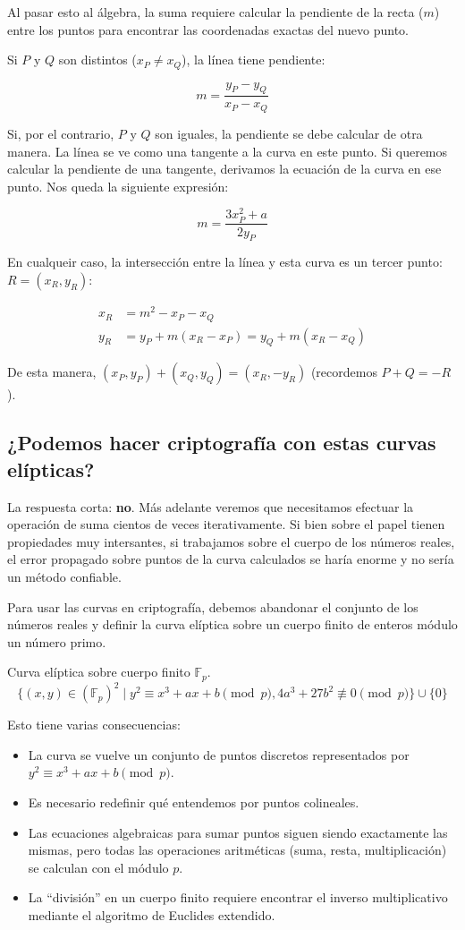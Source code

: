 Al pasar esto al álgebra, la suma requiere calcular la pendiente de la recta ($m$) entre los puntos para encontrar las coordenadas exactas del nuevo punto.

Si $P$ y $Q$ son distintos ($x_P \neq x_Q$), la línea tiene pendiente:

$$m = \frac{y_P - y_Q}{x_P - x_Q}$$


Si, por el contrario, $P$ y $Q$ son iguales, la pendiente se debe calcular de otra manera. La línea se ve como una tangente a la curva en este punto. Si queremos calcular la pendiente de una tangente, derivamos la ecuación de la curva en ese punto. Nos queda la siguiente expresión:

$$m = \frac{3x_P^2 + a}{2y_P}$$

En cualqueir caso, la intersección entre la línea y esta curva es un tercer punto: $R = (x_R, y_R)$:

$$
\begin{aligned}
x_R &= m^2 - x_P - x_Q \\
y_R &= y_P + m(x_R - x_P) = y_Q + m(x_R - x_Q)
\end{aligned}
$$

De esta manera, $(x_P, y_P) + (x_Q, y_Q) = (x_R, -y_R)$ (recordemos $P + Q = -R$).

\subsection{¿Podemos hacer criptografía con estas curvas elípticas?}

La respuesta corta: \textbf{no}. Más adelante veremos que necesitamos efectuar la operación de suma cientos de veces iterativamente. Si bien sobre el papel tienen propiedades muy intersantes, si trabajamos sobre el cuerpo de los números reales, el error propagado sobre puntos de la curva calculados se haría enorme y no sería un método confiable. 

Para usar las curvas en criptografía, debemos abandonar el conjunto de los números reales y definir la curva elíptica sobre un cuerpo finito de enteros módulo un número primo.

\begin{definition} Curva elíptica sobre cuerpo finito $\mathbb{F}_p$.
$$\{ (x, y) \in (\mathbb{F}_p)^2 \mid y^2 \equiv x^3 + ax + b \pmod p, 4a^3 + 27b^2 \not\equiv 0 \pmod p \} \cup \{0\}$$
\end{definition}

Esto tiene varias consecuencias:
\begin{itemize}
    \item La curva se vuelve un conjunto de puntos discretos representados por $y^2 \equiv x^3 + ax + b \pmod{p}$.
    \item Es necesario redefinir qué entendemos por puntos colineales.
    \item Las ecuaciones algebraicas para sumar puntos siguen siendo exactamente las mismas, pero todas las operaciones aritméticas (suma, resta, multiplicación) se calculan con el módulo $p$.
    \item La ``división'' en un cuerpo finito requiere encontrar el inverso multiplicativo mediante el algoritmo de Euclides extendido.
\end{itemize}

